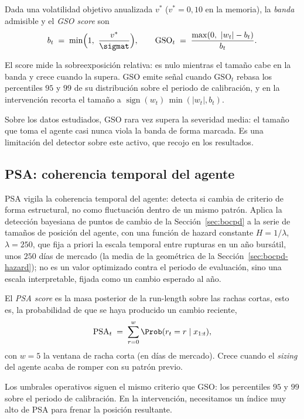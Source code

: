 \begin{definicion}
\label{def:gso}
Dada una volatilidad objetivo anualizada $v^{\ast}$ ($v^{\ast}=0{,}10$ en la memoria), la \emph{banda} admisible y el \emph{GSO score} son
\[
b_t \;=\; \min\!\Big(1,\ \frac{v^{\ast}}{\sigmat}\Big),
\qquad
\mathrm{GSO}_t \;=\; \frac{\max(0,\ |w_t| - b_t)}{b_t}.
\]
\end{definicion}

El score mide la sobreexposición relativa: es nulo mientras el tamaño cabe en la banda y crece cuando la supera. GSO emite señal cuando $\mathrm{GSO}_t$ rebasa los percentiles $95$ y $99$ de su distribución sobre el periodo de calibración, y en la intervención recorta el tamaño a $\operatorname{sign}(w_t)\,\min(|w_t|, b_t)$.

Sobre los datos estudiados, GSO rara vez supera la severidad media: el tamaño que toma el agente casi nunca viola la banda de forma marcada. Es una limitación del detector sobre este activo, que recojo en los resultados.

\subsection{PSA: coherencia temporal del agente}
\label{sec:strata-psa}

PSA vigila la coherencia temporal del agente: detecta si cambia de criterio de forma estructural, no como fluctuación dentro de un mismo patrón. Aplica la detección bayesiana de puntos de cambio de la Sección~\ref{sec:bocpd} a la serie de tamaños de posición del agente, con una función de hazard constante $H = 1/\lambda$, $\lambda = 250$, que fija a priori la escala temporal entre rupturas en un año bursátil, unos $250$ días de mercado (la media de la geométrica de la Sección~\ref{sec:bocpd-hazard}); no es un valor optimizado contra el periodo de evaluación, sino una escala interpretable, fijada como un cambio esperado al año.

\begin{definicion}
\label{def:psa}
El \emph{PSA score} es la masa posterior de la run-length sobre las rachas cortas, esto es, la probabilidad de que se haya producido un cambio reciente,
\[
\mathrm{PSA}_t \;=\; \sum_{r=0}^{w} \Prob(r_t = r \mid x_{1:t}),
\]
con $w=5$ la ventana de racha corta (en días de mercado). Crece cuando el \emph{sizing} del agente acaba de romper con su patrón previo.
\end{definicion}

Los umbrales operativos siguen el mismo criterio que GSO: los percentiles $95$ y $99$ sobre el periodo de calibración. En la intervención, necesitamos un índice muy alto de PSA para frenar la posición resultante.

